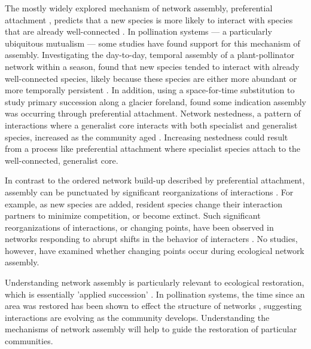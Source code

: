 \documentclass[12pt]{article}
\begin{document}
The mostly widely explored mechanism of network assembly, preferential
attachment \citep{barabasi1999emergence}, predicts that a new species
is more likely to interact with species that are already
well-connected \citep[''the rich-get-richer''
principle,][]{barabasi1999emergence}. In pollination systems --- a
particularly ubiquitous mutualism \citep{ollerton-2011-321,
  klein-2007-303} --- some studies have found support for this
mechanism of assembly. Investigating the day-to-day, temporal assembly
of a plant-pollinator network within a season, \cite{Olesen2008} found
that new species tended to interact with already well-connected
species, likely because these species are either more abundant or more
temporally persistent \citep{Olesen2008}. In addition, using a
space-for-time substitution to study primary succession along a
glacier foreland, \cite{albrecht2010plant} found some indication
assembly was occurring through preferential attachment. Network
nestedness, a pattern of interactions where a generalist core
interacts with both specialist and generalist species, increased as
the community aged \citep{albrecht2010plant}. Increasing nestedness
could result from a process like preferential attachment where
specialist species attach to the well-connected, generalist core.

In contrast to the ordered network build-up described by preferential
attachment, assembly can be punctuated by significant reorganizations
of interactions \citep{peel2014detecting}. For example, as new species
are added, resident species change their interaction partners to
minimize competition, or become extinct. Such significant
reorganizations of interactions, or changing points, have been
observed in networks responding to abrupt shifts in the behavior of
interacters \citep{peel2014detecting}. No studies, however, have
examined whether changing points occur during ecological network
assembly.

Understanding network assembly is particularly relevant to ecological
restoration, which is essentially 'applied succession'
\citep[e.g.,]{parker1997scale}. In pollination systems, the time since
an area was restored has been shown to effect the structure of
networks \citep{forup-2008-742, forup2008restoration,
  devoto2012understanding}, suggesting interactions are evolving as the
community develops. Understanding the mechanisms of network assembly
will help to guide the restoration of particular communities.
\end{document}
